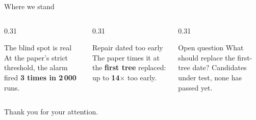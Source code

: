 \documentclass[aspectratio=169,11pt]{beamer}
\begin{document}
\begin{frame}{Where we stand}
  \vspace{0.5em}
  \begin{columns}[T,onlytextwidth]
    \begin{column}{0.31\textwidth}
      \begin{block}{The blind spot is real}
        At the paper's strict threshold, the alarm fired
        \textbf{3 times in 2\,000} runs.
      \end{block}
    \end{column}\hfill
    \begin{column}{0.31\textwidth}
      \begin{alertblock}{Repair dated too early}
        The paper times it at the \textbf{first tree} replaced:
        up to \textbf{14$\times$} too early.
      \end{alertblock}
    \end{column}\hfill
    \begin{column}{0.31\textwidth}
      \begin{exampleblock}{Open question}
        What should replace the first-tree date? Candidates
        under test, none has passed yet.
      \end{exampleblock}
    \end{column}
  \end{columns}
  \vfill
  \begin{center}Thank you for your attention.\end{center}
\end{frame}
\end{document}
